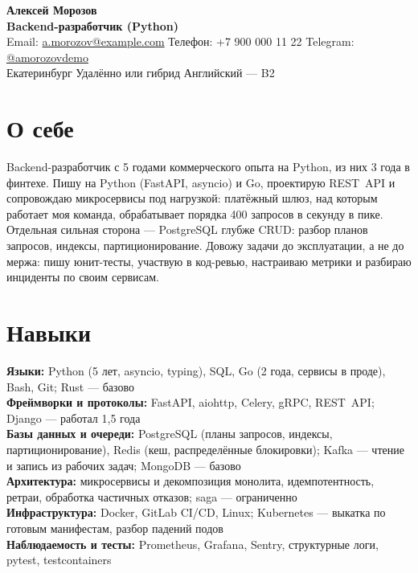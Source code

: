 \documentclass[a4paper,10pt]{article}
\makeatletter
\newcommand{\CICD}{\mbox{CI/CD}}
\newcommand{\RESTAPI}{\mbox{REST API}}
\newcommand{\CVName}{Алексей Морозов}
\newcommand{\CVTitle}{Backend-разработчик (Python)}
\newcommand{\CVEmail}{a.morozov@example.com}
\newcommand{\CVPhone}{+7 900 000 11 22}
\newcommand{\CVTelegram}{amorozovdemo}
\makeatother
\begin{document}
{\LARGE \textbf{\CVName}}\\
\textbf{\CVTitle}\\
Email: \href{mailto:\CVEmail}{\CVEmail} \quad
Телефон: \CVPhone \quad
Telegram: \href{https://t.me/\CVTelegram}{@\CVTelegram}\\
Екатеринбург \quad Удалённо или гибрид \quad Английский --- B2

\section*{О себе}

Backend-разработчик с 5 годами коммерческого опыта на Python, из них 3 года в финтехе.
Пишу на Python (FastAPI, asyncio) и Go, проектирую \RESTAPI{} и сопровождаю микросервисы
под нагрузкой: платёжный шлюз, над которым работает моя команда, обрабатывает порядка
400 запросов в секунду в пике. Отдельная сильная сторона --- PostgreSQL глубже CRUD:
разбор планов запросов, индексы, партиционирование. Довожу задачи до эксплуатации,
а не до мержа: пишу юнит-тесты, участвую в код-ревью, настраиваю метрики и разбираю
инциденты по своим сервисам.

\section*{Навыки}

\textbf{Языки:} Python (5 лет, asyncio, typing), SQL, Go (2 года, сервисы в проде),
Bash, Git; Rust --- базово\\
\textbf{Фреймворки и протоколы:} FastAPI, aiohttp, Celery, gRPC, \RESTAPI{};
Django --- работал 1,5 года\\
\textbf{Базы данных и очереди:} PostgreSQL (планы запросов, индексы,
партиционирование), Redis (кеш, распределённые блокировки); Kafka --- чтение и
запись из рабочих задач; MongoDB --- базово\\
\textbf{Архитектура:} микросервисы и декомпозиция монолита, идемпотентность, ретраи,
обработка частичных отказов; saga --- ограниченно\\
\textbf{Инфраструктура:} Docker, GitLab \CICD{}, Linux; Kubernetes --- выкатка по
готовым манифестам, разбор падений подов\\
\textbf{Наблюдаемость и тесты:} Prometheus, Grafana, Sentry, структурные логи,
pytest, testcontainers
\end{document}
